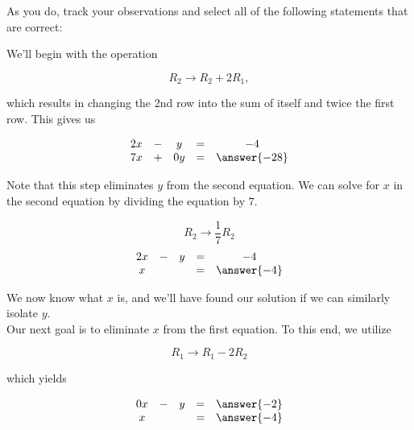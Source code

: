 \documentclass{ximera}
\begin{document}
\begin{exploration}
\begin{example}
    As you do, track your observations and select all of the following statements that are correct:

    \begin{selectAll}
  \end{selectAll}
     
    We'll begin with the operation
    
    $$R_2\rightarrow R_2+2R_1,$$
    
    which results in changing the 2nd row into the sum of itself and twice the first row.  This gives us
     
    $$ \begin{matrix}
          2x& -&y&=&-4\\
          7x & +&0y&= &\answer{-28} 
        \end{matrix}$$
     
    Note that this step eliminates $y$ from the second equation. We can solve for $x$ in the second equation by dividing the equation by $7$. 
    
    $$R_2\rightarrow \frac{1}{7}R_2$$
    $$\begin{matrix}
           2x& -&y&=&-4\\
          x & &&= &\answer{-4}
           \end{matrix}$$
       
    We now know what $x$ is, and we'll have found our solution if we can similarly isolate $y$. \\
    
    Our next goal is to eliminate $x$ from the first equation.  To this end, we utilize
    
    $$R_1\rightarrow R_1-2R_2$$

    which yields
     
    $$\begin{matrix}
         0x& -&y&=&\answer{-2}\\
         x & &&= &\answer{-4} \\
        \end{matrix}$$
     

\end{example}
\end{exploration}
\end{document}
